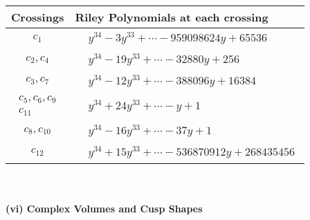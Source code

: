 \documentclass[1p]{elsarticle_modified}
\theoremstyle{definition}
\begin{document}
\begin{tabular}{m{50pt}|m{274pt}}
Crossings & \hspace{64pt}Riley Polynomials at each crossing \\
\hline $$\begin{aligned}c_{1}\end{aligned}$$&$\begin{aligned}
&y^{34}-3 y^{33}+\cdots-959098624 y+65536
\end{aligned}$\\
\hline $$\begin{aligned}c_{2},c_{4}\end{aligned}$$&$\begin{aligned}
&y^{34}-19 y^{33}+\cdots-32880 y+256
\end{aligned}$\\
\hline $$\begin{aligned}c_{3},c_{7}\end{aligned}$$&$\begin{aligned}
&y^{34}-12 y^{33}+\cdots-388096 y+16384
\end{aligned}$\\
\hline $$\begin{aligned}c_{5},c_{6},c_{9}\\c_{11}\end{aligned}$$&$\begin{aligned}
&y^{34}+24 y^{33}+\cdots- y+1
\end{aligned}$\\
\hline $$\begin{aligned}c_{8},c_{10}\end{aligned}$$&$\begin{aligned}
&y^{34}-16 y^{33}+\cdots-37 y+1
\end{aligned}$\\
\hline $$\begin{aligned}c_{12}\end{aligned}$$&$\begin{aligned}
&y^{34}+15 y^{33}+\cdots-536870912 y+268435456
\end{aligned}$\\
\hline
\end{tabular}\\~\\
\newpage\flushleft \textbf{(vi) Complex Volumes and Cusp Shapes}
\end{document}
